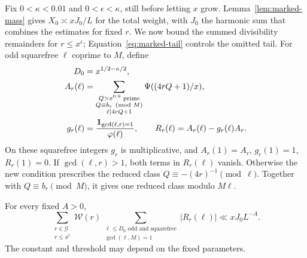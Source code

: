 Fix \(0<\kappa<0.01\) and \(0<\epsilon<\kappa\), still before letting
\(x\) grow.  Lemma~\ref{lem:marked-mass} gives \(X_0\asymp xJ_0/L\) for the
total weight, with \(J_0\) the harmonic sum that combines the
estimates for fixed \(r\).  We now bound the summed divisibility remainders
for \(r\le x^\epsilon\); Equation~\eqref{eq:marked-tail} controls the
omitted tail.  For odd squarefree \(\ell\) coprime to \(M\), define
\begin{equation}\label{eq:distribution-data}
 \begin{split}
 D_0&=x^{1/2-\kappa/2},\\
 A_r(\ell)&=\sum_{\substack{Q>x^{0.9}\text{ prime}\\
                    Q\equiv b_r\pmod M\\\ell\mid4rQ+1}}
                    \Psi((4rQ+1)/x),\\
 g_r(\ell)&=\frac{\mathbf 1_{\gcd(\ell,r)=1}}{\varphi(\ell)},
 \qquad R_r(\ell)=A_r(\ell)-g_r(\ell)A_r.
 \end{split}
\end{equation}
On these squarefree integers \(g_r\) is multiplicative, and
\(A_r(1)=A_r\), \(g_r(1)=1\), \(R_r(1)=0\).  If \(\gcd(\ell,r)>1\), both
terms in \(R_r(\ell)\) vanish.  Otherwise the new condition prescribes
the reduced class \(Q\equiv-(4r)^{-1}\pmod\ell\).  Together with
\(Q\equiv b_r\pmod M\), it gives one reduced class modulo \(M\ell\).

\begin{lemma}
\label{lem:averaged-distribution}
For every fixed \(A>0\),
\begin{equation}\label{eq:averaged-distribution}
 \sum_{\substack{r\in\mathcal G\\r\le x^\epsilon}}\mathcal W(r)
 \sum_{\substack{\ell\le D_0\text{ odd and squarefree}\\
                  \gcd(\ell,M)=1}}
       |R_r(\ell)|\ll xJ_0L^{-A}.
\end{equation}
The constant and threshold may depend on the fixed parameters.
\end{lemma}

